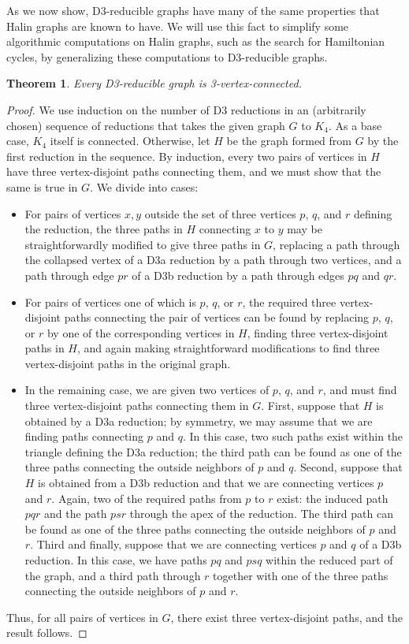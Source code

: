\documentclass{article}
\newtheorem{theorem}{Theorem}
\begin{document}
As we now show, D3-reducible graphs have many of the same properties that Halin graphs are known to have. We will use this fact to simplify some algorithmic computations on Halin graphs, such as the search for Hamiltonian cycles, by generalizing these computations to D3-reducible graphs.

\begin{theorem}
Every D3-reducible graph is 3-vertex-connected.
\end{theorem}

\begin{proof}
We use induction on the number of D3 reductions in an (arbitrarily chosen) sequence of reductions that takes the given graph $G$ to $K_4$. As a base case, $K_4$ itself is connected. Otherwise, let $H$ be the graph formed from $G$ by the first reduction in the sequence. By induction, every two pairs of vertices in $H$ have three vertex-disjoint paths connecting them, and we must show that the same is true in $G$. We divide into cases:
\begin{itemize}
\item For pairs of vertices $x,y$ outside the set of three vertices $p$, $q$, and $r$ defining the reduction,
the three paths in $H$ connecting $x$ to $y$ may be straightforwardly modified to give three paths in $G$, replacing a path through the collapsed vertex of a D3a reduction by a path through two vertices, and a path through edge $pr$ of a D3b reduction by a path through edges $pq$ and $qr$.
\item For pairs of vertices one of which is $p$, $q$, or $r$, the required three vertex-disjoint paths connecting the pair of vertices can be found by replacing $p$, $q$, or $r$ by one of the corresponding vertices in $H$, finding three vertex-disjoint paths in $H$, and again making straightforward modifications to find three vertex-disjoint paths in the original graph.
\item In the remaining case, we are given two vertices of $p$, $q$, and $r$, and must find three vertex-disjoint paths connecting them in $G$. First, suppose that $H$ is obtained by a D3a reduction; by symmetry, we may assume that we are finding paths connecting $p$ and $q$. In this case, two such paths exist within the triangle defining the D3a reduction; the third path can be found as one of the three paths connecting the outside neighbors of $p$ and $q$. Second, suppose that $H$ is obtained from a D3b reduction and that we are connecting vertices $p$ and $r$. Again, two of the required paths from $p$ to $r$ exist: the induced path $pqr$ and the path $psr$ through the apex of the reduction. The third path can be found as one of the three paths connecting the outside neighbors of $p$ and $r$. Third and finally, suppose that we are connecting vertices $p$ and $q$ of a D3b reduction. In this case, we have paths $pq$ and $psq$ within the reduced part of the graph, and a third path through $r$ together with one of the three paths connecting the outside neighbors of $p$ and $r$.
\end{itemize}
Thus, for all pairs of vertices in $G$, there exist three vertex-disjoint paths, and the result follows.
\end{proof}
\end{document}
